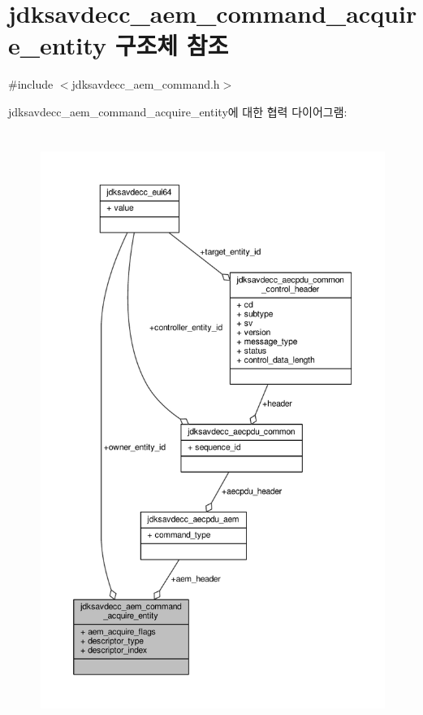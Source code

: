 \hypertarget{structjdksavdecc__aem__command__acquire__entity}{}\section{jdksavdecc\+\_\+aem\+\_\+command\+\_\+acquire\+\_\+entity 구조체 참조}
\label{structjdksavdecc__aem__command__acquire__entity}


{\ttfamily \#include $<$jdksavdecc\+\_\+aem\+\_\+command.\+h$>$}



jdksavdecc\+\_\+aem\+\_\+command\+\_\+acquire\+\_\+entity에 대한 협력 다이어그램\+:
\nopagebreak
\begin{figure}[H]
\begin{center}
\leavevmode
\includegraphics[height=550pt]{structjdksavdecc__aem__command__acquire__entity__coll__graph}
\end{center}
\end{figure}
